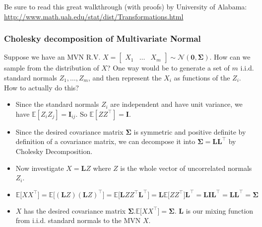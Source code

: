 \documentclass{harvardml}
\theoremstyle{definition}
\theoremstyle{plain}
\newcommand{\E}{\mathbb{E}}
\renewcommand{\v}[1]{\mathbf{#1}}
\begin{document}
		\noindent Be sure to read this great walkthrough (with proofs) by 
		University of Alabama:
		\url{http://www.math.uah.edu/stat/dist/Transformations.html}

		\subsubsection{Cholesky decomposition of Multivariate Normal}

			Suppose we have an MVN R.V. $X = \begin{bmatrix} X_1 & \ldots & X_m
            \end{bmatrix} \sim \mathcal{N}(\v 0, \v \Sigma)$. How can we sample 
            from the distribution of $X$? One way would be to generate 
            a set of $m$ i.i.d. standard normals $Z_1, \ldots, Z_m$, and then 
            represent the $X_i$ as functions of the $Z_i$. How to actually do this?
			
			\begin{itemize}
				\item Since the standard normals $Z_i$ are independent and
					  have unit variance, we have $\E[Z_i Z_j] = \v I_{ij}$.
					  So $\E[ZZ^\top] = \v I$.
				\item Since the desired covariance matrix $\v \Sigma$ is
					  symmetric and positive definite by definition of a
					  covariance matrix, we can decompose it into
					  $\v \Sigma = \v L \v L^\top$ by Cholesky Decomposition.
				\item Now investigate $X = \v L Z$ where $Z$ is the whole vector
					  of uncorrelated normals $Z_i$.
				\item $\E\big[XX^\top\big] = \E\big[(\v L Z)(\v L Z)^\top\big] =
					  \E\big[\v L Z Z^\top \v L^\top \big] = 
					  \v L \E\big[ZZ^\top\big]\v L^\top = \v L \v I \v L^\top =
					  \v L \v L^\top = \v \Sigma$
				\item $X$ has the desired covariance matrix $\v \Sigma. 
					  \E\big[XX^\top\big] = \v \Sigma$. $\v L$ is our
					  mixing function from i.i.d. standard normals to
					  the MVN $X$.
			\end{itemize}
\end{document}

